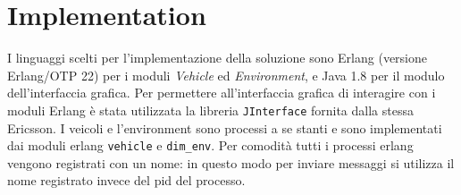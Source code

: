 \documentclass{memoir}
\begin{document}
\chapter{Implementation}

I linguaggi scelti per l'implementazione della soluzione sono Erlang (versione
Erlang/OTP 22) per i moduli \emph{Vehicle} ed \emph{Environment}, e Java 1.8 per
il modulo dell'interfaccia grafica. Per permettere all'interfaccia grafica di
interagire con i moduli Erlang è stata utilizzata la libreria
\texttt{JInterface} fornita dalla stessa Ericsson. I veicoli e l'environment
sono processi a se stanti e sono implementati dai moduli erlang \texttt{vehicle}
e \texttt{dim\_env}. Per comodità tutti i processi erlang vengono registrati con
un nome: in questo modo per inviare messaggi si utilizza il nome registrato
invece del pid del processo.
\end{document}
